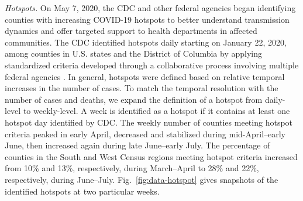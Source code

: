\documentclass[journal]{IEEEtran}
\begin{document}
\vspace{.05in}
\noindent\emph{Hotspots.}
On May 7, 2020, the CDC and other federal agencies began identifying counties with increasing COVID-19 hotspots to better understand transmission dynamics and offer targeted support to health departments in affected communities. The CDC identified hotspots daily starting on January 22, 2020, among counties in U.S. states and the District of Columbia by applying standardized criteria developed through a collaborative process involving multiple federal agencies \cite{oster2020trends, oster2020transmission}. In general, hotspots were defined based on relative temporal increases in the number of cases.
To match the temporal resolution with the number of cases and deaths, we expand the definition of a hotspot from daily-level to weekly-level. A week is identified as a hotspot if it contains at least one hotspot day identified by CDC.
The weekly number of counties meeting hotspot criteria peaked in early April, decreased and stabilized during mid-April–early June, then increased again during late June--early July. The percentage of counties in the South and West Census regions meeting hotspot criteria increased from 10\% and 13\%, respectively, during March--April to 28\% and 22\%, respectively, during June--July. Fig.~\ref{fig:data-hotspot} gives snapshots of the identified hotspots at two particular weeks. 
\end{document}
